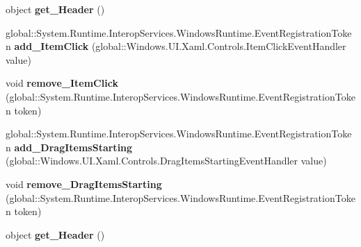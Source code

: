 \begin{DoxyCompactItemize}
\item 
\mbox{\label{interface_windows_1_1_u_i_1_1_xaml_1_1_controls_1_1_i_list_view_base_a7a7ead1b392f70c5f393d65cf2a4de87}} 
object {\bfseries get\+\_\+\+Header} ()
\item 
\mbox{\label{interface_windows_1_1_u_i_1_1_xaml_1_1_controls_1_1_i_list_view_base_a381c8434df16fa7e46ceaa5d481c0653}} 
global\+::\+System.\+Runtime.\+Interop\+Services.\+Windows\+Runtime.\+Event\+Registration\+Token {\bfseries add\+\_\+\+Item\+Click} (global\+::\+Windows.\+U\+I.\+Xaml.\+Controls.\+Item\+Click\+Event\+Handler value)
\item 
\mbox{\label{interface_windows_1_1_u_i_1_1_xaml_1_1_controls_1_1_i_list_view_base_a29b603576f74e0aaac225711b42e45e6}} 
void {\bfseries remove\+\_\+\+Item\+Click} (global\+::\+System.\+Runtime.\+Interop\+Services.\+Windows\+Runtime.\+Event\+Registration\+Token token)
\item 
\mbox{\label{interface_windows_1_1_u_i_1_1_xaml_1_1_controls_1_1_i_list_view_base_a3b355ad168b36f910e24d2c7ed82df17}} 
global\+::\+System.\+Runtime.\+Interop\+Services.\+Windows\+Runtime.\+Event\+Registration\+Token {\bfseries add\+\_\+\+Drag\+Items\+Starting} (global\+::\+Windows.\+U\+I.\+Xaml.\+Controls.\+Drag\+Items\+Starting\+Event\+Handler value)
\item 
\mbox{\label{interface_windows_1_1_u_i_1_1_xaml_1_1_controls_1_1_i_list_view_base_a98ffdf8ce44a2620717a8e03273d9029}} 
void {\bfseries remove\+\_\+\+Drag\+Items\+Starting} (global\+::\+System.\+Runtime.\+Interop\+Services.\+Windows\+Runtime.\+Event\+Registration\+Token token)
\item 
\mbox{\label{interface_windows_1_1_u_i_1_1_xaml_1_1_controls_1_1_i_list_view_base_a7a7ead1b392f70c5f393d65cf2a4de87}} 
object {\bfseries get\+\_\+\+Header} ()
\item 
\mbox{\label{interface_windows_1_1_u_i_1_1_xaml_1_1_controls_1_1_i_list_view_base_a381c8434df16fa7e46ceaa5d481c0653}} 

\end{DoxyCompactItemize}
